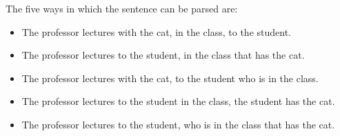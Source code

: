 \begin{exe}[4.45]
    The five ways in which the sentence can be parsed are:
    \begin{itemize}
        \item The professor lectures with the cat, in the class, to the student.
        \item The professor lectures to the student, in the class that has the 
            cat.
        \item The professor lectures with the cat, to the student who is in the 
            class.
        \item The professor lectures to the student in the class, the student 
            has the cat.
        \item The professor lectures to the student, who is in the class that 
            has the cat.
    \end{itemize}
\end{exe}
